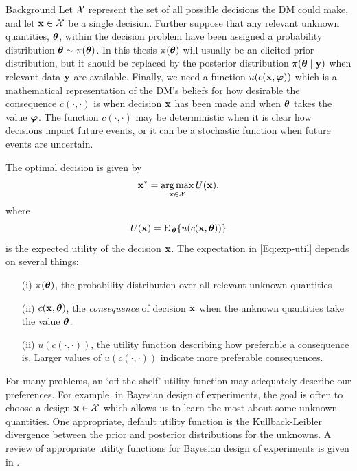 \begin{chapter}{Background \label{Ch:background}}
Let $\mathcal{X}$ represent the set of all possible decisions the DM could make, and let $\mathbf{x} \in \mathcal{X}$ be a single decision. Further suppose that any relevant unknown quantities, $\bm{\theta}$, within the decision problem have been assigned a probability distribution $\bm{\theta} \sim \pi (\bm{\theta})$. In this thesis $\pi(\bm{\theta})$ will usually be an elicited prior distribution, but it should be replaced by the posterior distribution $\pi(\bm{\theta} \mid \mathbf{y})$ when relevant data $\mathbf{y}$ are available. Finally, we need a function $u(c(\mathbf{x}, \bm{\varphi}))$ which is a mathematical representation of the DM's beliefs for how desirable the consequence $c(\cdot, \cdot)$ is when decision $\mathbf{x}$ has been made and when $\bm{\theta}$ takes the value $\bm{\varphi}$. The function $c(\cdot, \cdot)$ may be deterministic when it is clear how decisions impact future events, or it can be a stochastic function when future events are uncertain.

The optimal decision is given by
\begin{equation}
  \mathbf{x}^{*} = \operatorname*{arg\,max}_{\mathbf{x} \in \mathcal{X}} U(\mathbf{x}). \label{Eq:opt-dec}
\end{equation}
where
\begin{equation}
U(\mathbf{x}) = \textrm{E}\,_{\bm{\theta}} \{ u(c(\mathbf{x}, \bm{\theta})) \} \label{Eq:exp-util}
\end{equation}
is the expected utility of the decision $\mathbf{x}$. The expectation in \cref{Eq:exp-util} depends on several things:
\begin{itemize}
  \item[(i)] $\pi(\bm{\theta})$, the probability distribution over all relevant unknown quantities
  \item[(ii)] $c(\mathbf{x}, \bm{\theta})$, the \textit{consequence} of decision $\mathbf{x}$ when the unknown quantities take the value $\bm{\theta}$.
  \item[(ii)] $u(c(\cdot, \cdot))$, the utility function describing how preferable a consequence is. Larger values of $u(c(\cdot, \cdot))$ indicate more preferable consequences.
\end{itemize}

For many problems, an `off the shelf' utility function may adequately describe our preferences. For example, in Bayesian design of experiments, the goal is often to choose a design $\mathbf{x} \in \mathcal{X}$ which allows us to learn the most about some unknown quantities. One appropriate, default utility function is the Kullback-Leibler divergence between the prior and posterior distributions for the unknowns. A review of appropriate utility functions for Bayesian design of experiments is given in \citet{Ryan2016}.


\end{chapter}
